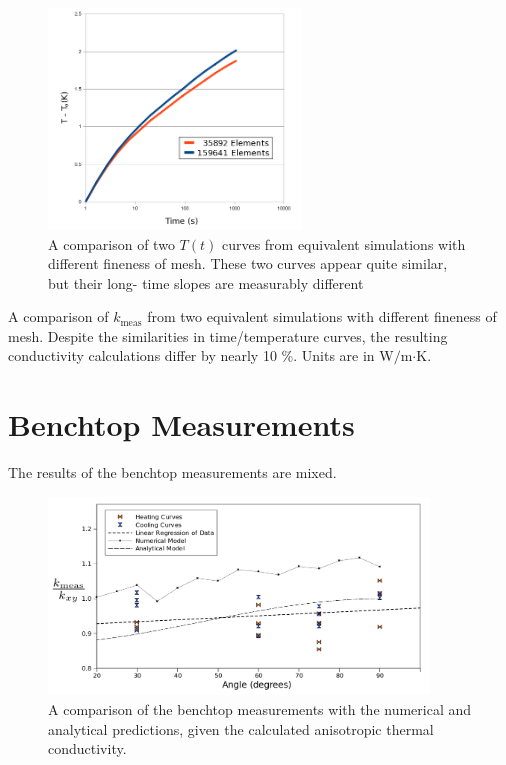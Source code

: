 \begin{figure}[h]
\centering
\includegraphics[width=0.6\textwidth]{fig/conv_curves.png}
\caption{A comparison of two \(T(t)\) curves from equivalent simulations with 
different fineness of mesh. These two curves appear quite similar, but their long-
time slopes are measurably different}
\label{fig:conv_curves}
\end{figure}


\begin{table}[h]
\centering

\caption{A comparison of \(k_{\textrm{meas}}\) from two equivalent simulations 
with different fineness of mesh. Despite the similarities in time/temperature
curves, the resulting  conductivity calculations differ by nearly 10 \%. Units are in W\(/\)m\(\cdot\)K.}
\label{tab:conv_kvals}
\end{table}

\section{Benchtop Measurements}

The results of the benchtop measurements are mixed.

\begin{figure}[h]
\centering
\includegraphics[width=0.9\textwidth]{fig/test_results.png}
\caption{A comparison of the benchtop measurements with the numerical and
analytical predictions, given the calculated anisotropic thermal conductivity.}
\label{fig:test_results}
\end{figure}

